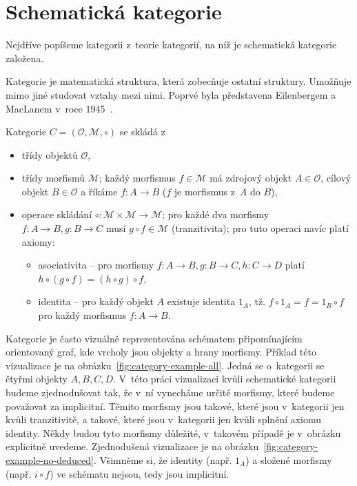 \section{Schematická kategorie}

Nejdříve popíšeme kategorii z~teorie kategorií, na níž je schematická kategorie založena.

Kategorie je matematická struktura, která zobecňuje ostatní struktury.
Umožňuje mimo jiné studovat vztahy mezi nimi.
Poprvé byla představena Eilenbergem a MacLanem v~roce 1945~\cite{eilenberg_1945}.

Kategorie $C=(\mathcal O, \mathcal M, \circ)$ se skládá
z~\begin{itemize}
  \item třídy objektů $\mathcal O$,
  \item třídy morfismů $\mathcal M$; každý morfismus $f \in \mathcal M$ má zdrojový objekt $A\in\mathcal O$, cílový objekt $B\in\mathcal O$ a říkáme $f: A\to B$ ($f$ je morfismus z~$A$ do $B$),
  \item operace skládání $\circ\colon \mathcal M\times\mathcal M \to \mathcal M$; pro každé dva morfismy $f\colon A\to B, g\colon B\to C$ musí $g\circ f\in \mathcal M$ (tranzitivita); pro tuto operaci navíc platí axiomy:
        \begin{itemize}
          \item asociativita -- pro morfismy $f\colon A\to B, g\colon B\to C, h\colon C\to D$ platí $h\circ (g \circ f) = (h\circ g)\circ f$,
          \item identita -- pro každý objekt $A$ existuje identita $1_A$, tž. $f\circ 1_A = f = 1_B\circ f$ pro každý morfismus $f: A\to B$.
        \end{itemize}
\end{itemize}

Kategorie je často vizuálně reprezentována schématem připomínajícím orientovaný graf, kde vrcholy jsou objekty a hrany morfismy.
Příklad této vizualizace je na obrázku~\ref{fig:category-example-all}.
Jedná se o~kategorii se čtyřmi objekty $A, B, C, D$.
V~této práci vizualizaci kvůli schematické kategorii budeme zjednodušovat tak, že v~ní vynecháme určité morfismy, které budeme považovat za implicitní.
Těmito morfismy jsou takové, které jsou v~kategorii jen kvůli tranzitivitě, a takové, které jsou v~kategorii jen kvůli splnění axiomu identity.
Někdy budou tyto morfismy důležité, v~takovém případě je v~obrázku explicitně uvedeme.
Zjednodušená vizualizace je na obrázku~\ref{fig:category-example-no-deduced}.
Všimněme si, že identity (např. $1_A$) a složené morfismy (např. $i\circ f$) ve schématu nejsou, tedy jsou implicitní.


